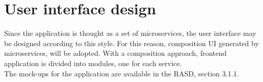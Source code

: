 \section{User interface design}
Since the application is thought as a set of  microservices, the user interface may be designed according to
this style. 
For this reason, composition UI generated by microservices, will be adopted. 
With a composition approach, frontend application is divided into modules, one for each service.  \\
The mock-ups for the application are available in the RASD, section 3.1.1. 